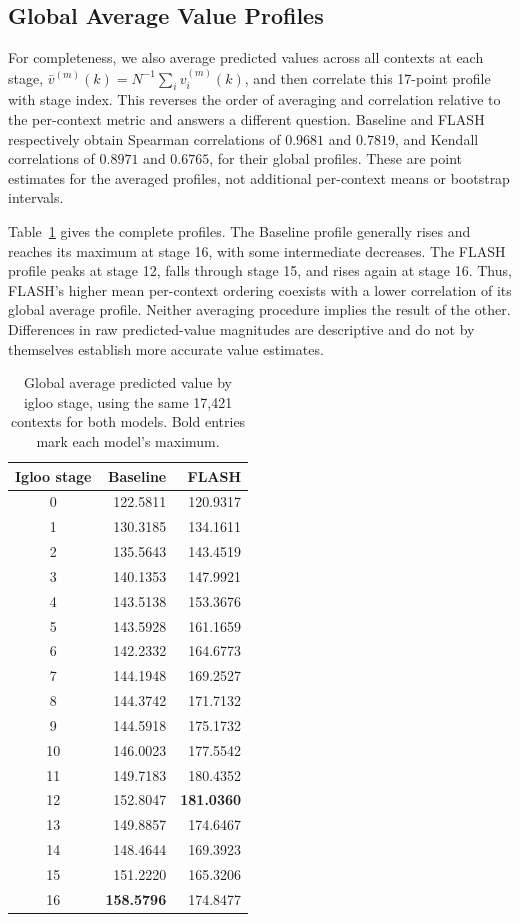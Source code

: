 \documentclass{article} %
\begin{document}
\subsection{Global Average Value Profiles}
For completeness, we also average predicted values across all contexts at each stage, $\bar v^{(m)}(k)=N^{-1}\sum_i v_i^{(m)}(k)$, and then correlate this 17-point profile with stage index. This reverses the order of averaging and correlation relative to the per-context metric and answers a different question. Baseline and FLASH respectively obtain Spearman correlations of $0.9681$ and $0.7819$, and Kendall correlations of $0.8971$ and $0.6765$, for their global profiles. These are point estimates for the averaged profiles, not additional per-context means or bootstrap intervals.

Table~\ref{tab:global_average_values} gives the complete profiles. The Baseline profile generally rises and reaches its maximum at stage 16, with some intermediate decreases. The FLASH profile peaks at stage 12, falls through stage 15, and rises again at stage 16. Thus, FLASH's higher mean per-context ordering coexists with a lower correlation of its global average profile. Neither averaging procedure implies the result of the other. Differences in raw predicted-value magnitudes are descriptive and do not by themselves establish more accurate value estimates.

\begin{table}[H]
\centering
\small
\caption{Global average predicted value by igloo stage, using the same 17,421 contexts for both models. Bold entries mark each model's maximum.}
\label{tab:global_average_values}
\begin{tabular}{crr}
\toprule
Igloo stage & Baseline & FLASH \\
\midrule
0 & 122.5811 & 120.9317 \\
1 & 130.3185 & 134.1611 \\
2 & 135.5643 & 143.4519 \\
3 & 140.1353 & 147.9921 \\
4 & 143.5138 & 153.3676 \\
5 & 143.5928 & 161.1659 \\
6 & 142.2332 & 164.6773 \\
7 & 144.1948 & 169.2527 \\
8 & 144.3742 & 171.7132 \\
9 & 144.5918 & 175.1732 \\
10 & 146.0023 & 177.5542 \\
11 & 149.7183 & 180.4352 \\
12 & 152.8047 & \textbf{181.0360} \\
13 & 149.8857 & 174.6467 \\
14 & 148.4644 & 169.3923 \\
15 & 151.2220 & 165.3206 \\
16 & \textbf{158.5796} & 174.8477 \\
\bottomrule
\end{tabular}
\end{table}
\end{document}
